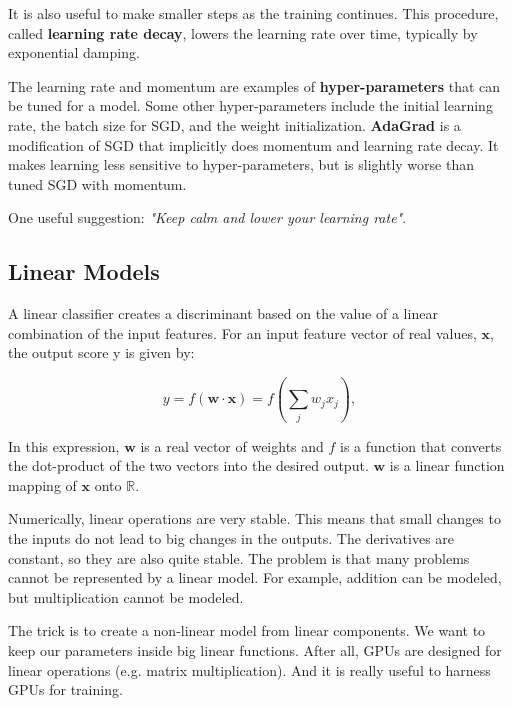 It is also useful to make smaller steps as the training continues. This procedure, called \textbf{learning rate decay}, lowers the learning rate over time, typically by exponential damping. 

The learning rate and momentum are examples of \textbf{hyper-parameters} that can be tuned for a model. Some other hyper-parameters include the initial learning rate, the batch size for SGD, and the weight initialization. \textbf{AdaGrad} is a modification of SGD that implicitly does momentum and learning rate decay. It makes learning less sensitive to hyper-parameters, but is slightly worse than tuned SGD with momentum. 

One useful suggestion: \textit{"Keep calm and lower your learning rate"}. 

\subsection{Linear Models}

A linear classifier creates a discriminant based on the value of a linear combination of the input features. For an input feature vector of real values, $\mathbf{x}$, the output score y is given by:

\begin{equation}
	y = f(\mathbf{w} \cdot \mathbf{x}) = f( \sum_{j} w_{j} x_{j}),
\end{equation}

In this expression, $\mathbf{w}$ is a real vector of weights and $f$ is a function that converts the dot-product of the two vectors into the desired output. $\mathbf{w}$ is a linear function mapping of $\mathbf{x}$ onto $\mathbb{R}$.

Numerically, linear operations are very stable. This means that small changes to the inputs do not lead to big changes in the outputs. The derivatives are constant, so they are also quite stable. The problem is that many problems cannot be represented by a linear model. For example, addition can be modeled, but multiplication cannot be modeled. 

The trick is to create a non-linear model from linear components. We want to keep our parameters inside big linear functions. After all, GPUs are designed for linear operations (e.g. matrix multiplication). And it is really useful to harness GPUs for training. 

